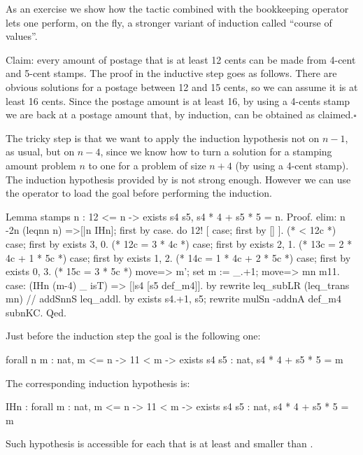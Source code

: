 As an exercise we show how the  tactic combined with the bookkeeping
operator \C{:} lets one perform, on the fly, a stronger variant of
induction called ``course of values''.

Claim: every amount of postage that is at least 12 cents
can be made from 4-cent and 5-cent stamps.  The proof in the inductive
step goes as follows.  There are obvious solutions for a postage between
12 and 15 cents, so we can assume it is at least 16 cents.  Since
the postage amount is at least 16, by using a 4-cents stamp we are back
at a postage amount that, by induction, can be obtained as claimed.\hfill$\square$

The tricky step is that we want to apply the induction hypothesis not
on $n-1$, as usual, but on $n-4$, since we know how to turn a
solution for a stamping amount problem $n$ to one for a problem of
size $n+4$ (by using a 4-cent stamp).
The induction hypothesis provided by 
is not strong enough.  However we can use the \C{:} operator
to load the goal before performing the induction.

\begin{coq}{}{}
Lemma stamps n : 12 <= n -> exists s4 s5, s4 * 4 + s5 * 5 = n.
Proof.
elim: n {-2}n (leqnn n) =>[|n IHn]; first by case.
do 12! [ case; first by [] ]. (* < 12c *)
case; first by exists 3, 0.   (* 12c = 3 * 4c *)
case; first by exists 2, 1.   (* 13c = 2 * 4c + 1 * 5c *)
case; first by exists 1, 2.   (* 14c = 1 * 4c + 2 * 5c *)
case; first by exists 0, 3.   (* 15c = 3 * 5c *)
move=> m'; set m := _.+1; move=> mn m11.
case: (IHn (m-4) _ isT) => [|s4 [s5 def_m4]].
  by rewrite leq_subLR (leq_trans mn) // addSnnS leq_addl.
by exists s4.+1, s5; rewrite mulSn -addnA def_m4 subnKC.
Qed.
\end{coq}

Just before the induction step the goal is the following one:

\begin{coq}{}{}
forall n m : nat,
  m <= n -> 11 < m -> exists s4 s5 : nat, s4 * 4 + s5 * 5 = m
\end{coq}
The corresponding induction hypothesis  is:

\begin{coq}{}{}
IHn : forall m : nat,
      m <= n ->
      11 < m -> exists s4 s5 : nat, s4 * 4 + s5 * 5 = m
\end{coq}
Such hypothesis is accessible for each  that is at least 
and smaller than .

